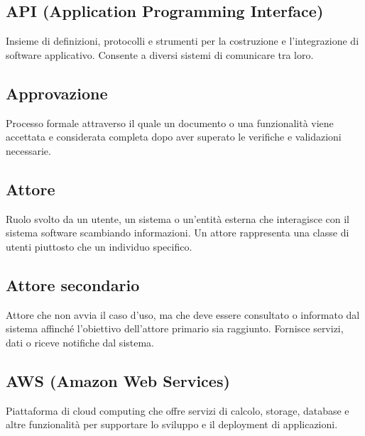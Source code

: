 \documentclass[a4paper,11pt]{article}
\begin{document}
\subsection{API (Application Programming Interface)}
Insieme di definizioni, protocolli e strumenti per la costruzione e l'integrazione di software applicativo. Consente a diversi sistemi di comunicare tra loro.









\subsection{Approvazione}
Processo formale attraverso il quale un documento o una funzionalità viene accettata e considerata completa dopo aver superato le verifiche e validazioni necessarie.









\subsection{Attore}
Ruolo svolto da un utente, un sistema o un'entità esterna che interagisce con il sistema software scambiando informazioni. Un attore rappresenta una classe di utenti piuttosto che un individuo specifico.







\subsection{Attore secondario}
Attore che non avvia il caso d'uso, ma che deve essere consultato o informato dal sistema affinché l'obiettivo dell'attore primario sia raggiunto. Fornisce servizi, dati o riceve notifiche dal sistema.








\subsection{AWS (Amazon Web Services)}
Piattaforma di cloud computing che offre servizi di calcolo, storage, database e altre funzionalità per supportare lo sviluppo e il deployment di applicazioni.
\end{document}
